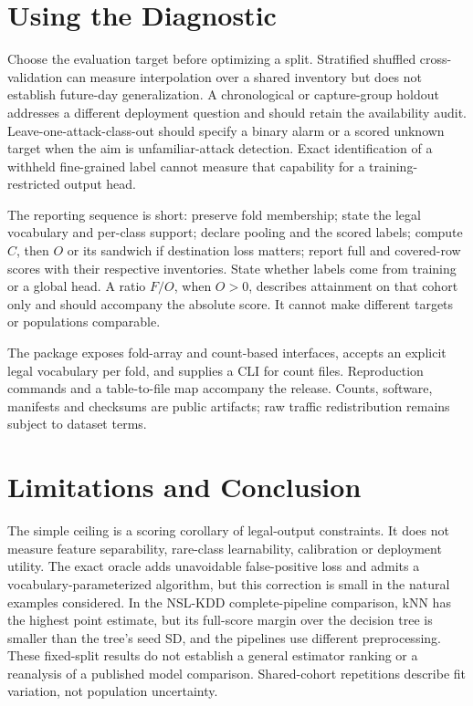 \documentclass[namedate,webpdf,contemporary,large]{TBench-template}
\begin{document}
\section{Using the Diagnostic}
Choose the evaluation target before optimizing a split. Stratified shuffled cross-validation can measure interpolation over a shared inventory but does not establish future-day generalization. A chronological or capture-group holdout addresses a different deployment question and should retain the availability audit. Leave-one-attack-class-out should specify a binary alarm or a scored unknown target when the aim is unfamiliar-attack detection. Exact identification of a withheld fine-grained label cannot measure that capability for a training-restricted output head.

The reporting sequence is short: preserve fold membership; state the legal vocabulary and per-class support; declare pooling and the scored labels; compute \(C\), then \(O\) or its sandwich if destination loss matters; report full and covered-row scores with their respective inventories. State whether labels come from training or a global head. A ratio \(F/O\), when \(O>0\), describes attainment on that cohort only and should accompany the absolute score. It cannot make different targets or populations comparable.

The package exposes fold-array and count-based interfaces, accepts an explicit legal vocabulary per fold, and supplies a CLI for count files. Reproduction commands and a table-to-file map accompany the release. Counts, software, manifests and checksums are public artifacts; raw traffic redistribution remains subject to dataset terms.

\section{Limitations and Conclusion}
The simple ceiling is a scoring corollary of legal-output constraints. It does not measure feature separability, rare-class learnability, calibration or deployment utility. The exact oracle adds unavoidable false-positive loss and admits a vocabulary-parameterized algorithm, but this correction is small in the natural examples considered. In the NSL-KDD complete-pipeline comparison, kNN has the highest point estimate, but its full-score margin over the decision tree is smaller than the tree's seed SD, and the pipelines use different preprocessing. These fixed-split results do not establish a general estimator ranking or a reanalysis of a published model comparison. Shared-cohort repetitions describe fit variation, not population uncertainty.
\end{document}
